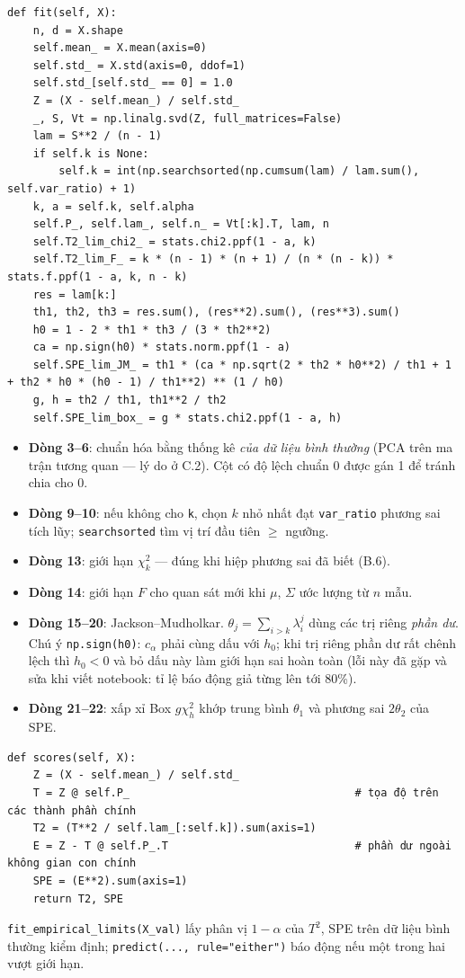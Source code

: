 \documentclass[11pt,a4paper]{article}
\newcommand{\code}[1]{\texttt{#1}}
\begin{document}
\begin{verbatim}
def fit(self, X):
    n, d = X.shape
    self.mean_ = X.mean(axis=0)
    self.std_ = X.std(axis=0, ddof=1)
    self.std_[self.std_ == 0] = 1.0
    Z = (X - self.mean_) / self.std_
    _, S, Vt = np.linalg.svd(Z, full_matrices=False)
    lam = S**2 / (n - 1)
    if self.k is None:
        self.k = int(np.searchsorted(np.cumsum(lam) / lam.sum(), self.var_ratio) + 1)
    k, a = self.k, self.alpha
    self.P_, self.lam_, self.n_ = Vt[:k].T, lam, n
    self.T2_lim_chi2_ = stats.chi2.ppf(1 - a, k)
    self.T2_lim_F_ = k * (n - 1) * (n + 1) / (n * (n - k)) * stats.f.ppf(1 - a, k, n - k)
    res = lam[k:]
    th1, th2, th3 = res.sum(), (res**2).sum(), (res**3).sum()
    h0 = 1 - 2 * th1 * th3 / (3 * th2**2)
    ca = np.sign(h0) * stats.norm.ppf(1 - a)
    self.SPE_lim_JM_ = th1 * (ca * np.sqrt(2 * th2 * h0**2) / th1 + 1 + th2 * h0 * (h0 - 1) / th1**2) ** (1 / h0)
    g, h = th2 / th1, th1**2 / th2
    self.SPE_lim_box_ = g * stats.chi2.ppf(1 - a, h)
\end{verbatim}
\begin{itemize}
\item \textbf{Dòng 3–6}: chuẩn hóa bằng thống kê \emph{của dữ liệu bình thường} (PCA trên ma trận tương quan — lý do ở C.2). Cột có độ lệch chuẩn 0 được gán 1 để tránh chia cho 0.
\item \textbf{Dòng 9–10}: nếu không cho \code{k}, chọn $k$ nhỏ nhất đạt \code{var\_ratio} phương sai tích lũy; \code{searchsorted} tìm vị trí đầu tiên $\ge$ ngưỡng.
\item \textbf{Dòng 13}: giới hạn $\chi^2_k$ — đúng khi hiệp phương sai đã biết (B.6).
\item \textbf{Dòng 14}: giới hạn $F$ cho quan sát mới khi $\mu$, $\Sigma$ ước lượng từ $n$ mẫu.
\item \textbf{Dòng 15–20}: Jackson–Mudholkar. $\theta_j=\sum_{i>k}\lambda_i^j$ dùng các trị riêng \emph{phần dư}. Chú ý \code{np.sign(h0)}: $c_\alpha$ phải cùng dấu với $h_0$; khi trị riêng phần dư rất chênh lệch thì $h_0<0$ và bỏ dấu này làm giới hạn sai hoàn toàn (lỗi này đã gặp và sửa khi viết notebook: tỉ lệ báo động giả từng lên tới 80\%).
\item \textbf{Dòng 21–22}: xấp xỉ Box $g\chi^2_h$ khớp trung bình $\theta_1$ và phương sai $2\theta_2$ của SPE.
\end{itemize}
\begin{verbatim}
def scores(self, X):
    Z = (X - self.mean_) / self.std_
    T = Z @ self.P_                                   # tọa độ trên các thành phần chính
    T2 = (T**2 / self.lam_[:self.k]).sum(axis=1)
    E = Z - T @ self.P_.T                             # phần dư ngoài không gian con chính
    SPE = (E**2).sum(axis=1)
    return T2, SPE
\end{verbatim}
\code{fit\_empirical\_limits(X\_val)} lấy phân vị $1-\alpha$ của $T^2$, SPE trên dữ liệu bình thường kiểm định; \code{predict(..., rule="either")} báo động nếu một trong hai vượt giới hạn.
\end{document}
